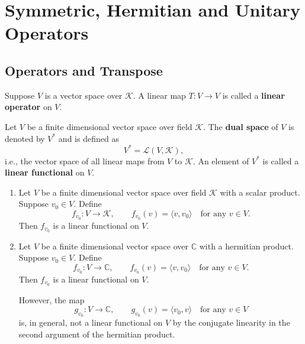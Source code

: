     \chapter{Symmetric, Hermitian and Unitary Operators}
    \section{Operators and Transpose}
    \begin{definitionenv}
        Suppose $V$ is a vector space over $\mathcal{K}$. A linear map $T: V \to V$ is called a \textbf{linear operator} on $V$. 
    \end{definitionenv}
    \begin{definitionenv}
    Let $V$ be a finite dimensional vector space over field $\mathcal{K}$. The \textbf{dual space} of $V$ is denoted by $V^*$ and is defined as
    \[
    V^*=\mathcal{L}(V,\mathcal{K}),
    \]
    i.e., the vector space of all linear maps from $V$ to $\mathcal{K}$. An element of $V^*$ is called a \textbf{linear functional} on $V$.
    \end{definitionenv}

    \begin{exampleenv}
    \leavevmode
    \begin{enumerate}
        \item Let $V$ be a finite dimensional vector space over field $\mathcal{K}$ with a scalar product. Suppose $v_0\in V$. Define
        \[
        f_{v_0}:V\to \mathcal{K},\qquad f_{v_0}(v)=\langle v,v_0\rangle
        \quad \text{for any } v\in V.
        \]
        Then $f_{v_0}$ is a linear functional on $V$.

        \item Let $V$ be a finite dimensional vector space over $\mathbb{C}$ with a hermitian product. Suppose $v_0\in V$. Define
        \[
        f_{v_0}:V\to \mathbb{C},\qquad f_{v_0}(v)=\langle v,v_0\rangle
        \quad \text{for any } v\in V.
        \]
        Then $f_{v_0}$ is a linear functional on $V$.

        However, the map
        \[
        g_{v_0}:V\to \mathbb{C},\qquad g_{v_0}(v)=\langle v_0,v\rangle
        \quad \text{for any } v\in V
        \]
        is, in general, not a linear functional on $V$ by the conjugate linearity in the second argument of the hermitian product.
    \end{enumerate}
    \end{exampleenv}

